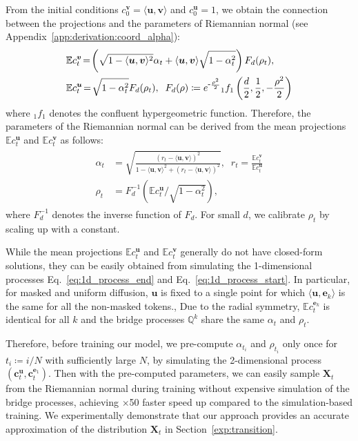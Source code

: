 From the initial conditions $c^{\bm{v}}_0 = \langle\bm{u},\bm{v}\rangle$ and $c^{\bm{u}}_0 = 1$, we obtain the connection between the projections and the parameters of Riemannian normal (see Appendix~\ref{app:derivation:coord_alpha}):
\begin{align}
    &\mathbb{E}c^{\bm{v}}_t 
    \!=\! \left( 
        \sqrt{1 - \langle \bm{u}, \bm{v}\rangle^2}\alpha_t + \langle \bm{u}, \bm{v}\rangle \sqrt{1 - \alpha_t^2}
    \right) F_d(\rho_t), \notag \\
    &\mathbb{E}c^{\bm{u}}_t 
    \!=\! \sqrt{1-\alpha_t^2} F_d(\rho_t), \;\; 
    F_d(\rho)\coloneqq e^{\scalebox{0.85}[1.0]{-} \frac{\rho^2}{2}} {}_{1}f_1\left(\frac{d}{2},\frac{1}{2}, -\frac{\rho^2}{2}\right) \notag
\end{align}
where ${}_1f_1$ denotes the confluent hypergeometric function. 
Therefore, the parameters of the Riemannian normal can be derived from the mean projections $\mathbb{E}c^{\bm{u}}_t$ and $\mathbb{E}c^{\bm{v}}_t$ as follows:
\begin{align}
\begin{split}
    \alpha_t &= \sqrt{\frac{(r_t - \langle \bm{u}, \bm{v}\rangle)^2}{1 - \langle \bm{u}, \bm{v}\rangle^2 + (r_t - \langle \bm{u}, \bm{v}\rangle)^2}}, \;\; r_t = \frac{\mathbb{E}c_t^{\bm{v}}}{\mathbb{E}c_t^{\bm{u}}} \\
    \rho_t &= F_d^{-1}\left(
    \mathbb{E}c^{\bm{u}}_t / \sqrt{1 - \alpha_t^2} \right),
\end{split}
\label{eq:from_coord_process}
\end{align}
where $F_d^{-1}$ denotes the inverse function of $F_d$. 
For small $d$, we calibrate $\rho_t$ by scaling up with a constant. 


While the mean projections $\mathbb{E}c^{\bm{u}}_t$ and $\mathbb{E}c^{\bm{v}}_t$ generally do not have closed-form solutions, they can be easily obtained from simulating the 1-dimensional processes Eq.~\eqref{eq:1d_process_end} and Eq.~\eqref{eq:1d_process_start}. 
In particular, for masked and uniform diffusion, $\bm{u}$ is fixed to a single point for which $\langle \bm{u},\bm{e}_k\rangle$ is the same for all the non-masked tokens., Due to the radial symmetry, $\mathbb{E}c^{\bm{e}_k}_t$ is identical for all $k$ and the bridge processes $\mathbb{Q}^{k}$ share the same $\alpha_t$ and $\rho_t$. 


Therefore, before training our model, we pre-compute $\alpha_{t_i}$ and $\rho_{t_i}$ only once for $t_i\coloneqq i/N$ with sufficiently large $N$, by simulating the 2-dimensional process $(\bm{c}^{\bm{u}}_t,\bm{c}^{\bm{e}_1}_t)$.
Then with the pre-computed parameters, we can easily sample $\bm{X}_t$ from the Riemannian normal during training without expensive simulation of the bridge processes, achieving $\times$50 faster speed up compared to the simulation-based training.
We experimentally demonstrate that our approach provides an accurate approximation of the distribution $\bm{X}_t$ in Section~\ref{exp:transition}.



